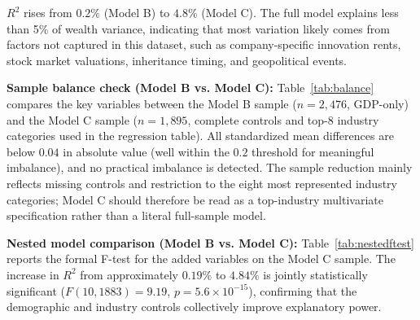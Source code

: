 \documentclass[a4paper,10pt]{article}
\begin{document}
$R^2$ rises from $0.2\%$ (Model B) to $4.8\%$ (Model C). The full model explains less than 5\% of wealth variance, indicating that most variation likely comes from factors not captured in this dataset, such as company-specific innovation rents, stock market valuations, inheritance timing, and geopolitical events.

\begin{table}[H]
\centering
\caption{Regression results: OLS with HC3 robust standard errors and 95\% CIs. Model A: raw scale (pedagogical baseline). Model B: bivariate log-log (primary specification). Model C: multivariate log-log with demographic and industry controls. $\beta_1$ in Model B is the \emph{elasticity} of wealth with respect to GDP.}
\label{tab:regmain}
\scriptsize
\setlength{\tabcolsep}{2.2pt}
\resizebox{\textwidth}{!}{}
\end{table}

\textbf{Sample balance check (Model B vs. Model C):} Table~\ref{tab:balance} compares the key variables between the Model B sample ($n=2{,}476$, GDP-only) and the Model C sample ($n=1{,}895$, complete controls and top-8 industry categories used in the regression table). All standardized mean differences are below $0.04$ in absolute value (well within the $0.2$ threshold for meaningful imbalance), and no practical imbalance is detected. The sample reduction mainly reflects missing controls and restriction to the eight most represented industry categories; Model C should therefore be read as a top-industry multivariate specification rather than a literal full-sample model.

\begin{table}[H]
\centering
\caption{Sample balance: Model B ($n=2{,}476$) vs. Model C ($n=1{,}895$) on key analytical variables. Standardized difference $<$0.1 is negligible; $<$0.2 is acceptable. All differences are well within acceptable bounds.}
\label{tab:balance}
\small

\end{table}

\textbf{Nested model comparison (Model B vs. Model C):} Table~\ref{tab:nestedftest} reports the formal F-test for the added variables on the Model C sample. The increase in $R^2$ from approximately $0.19\%$ to $4.84\%$ is jointly statistically significant ($F(10, 1883) = 9.19$, $p = 5.6\times10^{-15}$), confirming that the demographic and industry controls collectively improve explanatory power.

\begin{table}[H]
\centering
\caption{Nested F-test: Model C vs. Model B on the Model C sample. Added variables (age, selfMade, gender, category indicators) jointly improve fit significantly.}
\label{tab:nestedftest}
\small

\end{table}
\end{document}
